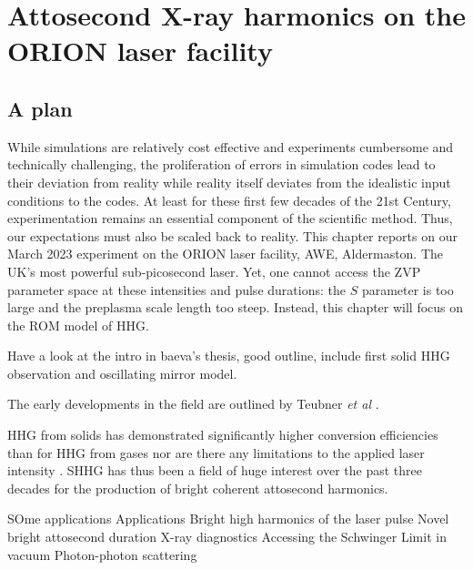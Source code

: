 \chapter{\label{ch:3-orion}Attosecond X-ray harmonics on the ORION laser facility} 

\minitoc

\section{A plan}

While simulations are relatively cost effective and experiments cumbersome and technically challenging, the proliferation of errors in simulation codes lead to their deviation from reality while reality itself deviates from the idealistic input conditions to the codes. At least for these first few decades of the 21st Century, experimentation remains an essential component of the scientific method. Thus, our expectations must also be scaled back to reality. This chapter reports on our March 2023 experiment on the ORION laser facility, AWE, Aldermaston. The UK's most powerful sub-picosecond laser. Yet, one cannot access the ZVP parameter space at these intensities and pulse durations: the $S$ parameter is too large and the preplasma scale length too steep. Instead, this chapter will focus on the ROM model of HHG. 


Have a look at the intro in baeva's thesis, good outline, include first solid HHG observation and oscillating mirror model.

The early developments in the field are outlined by Teubner \textit{et al} \cite{teubnerHighorderHarmonicsLaserirradiated2009}.


HHG from solids has demonstrated significantly higher conversion efficiencies than for HHG from gases nor are there any limitations to the applied laser intensity \cite{teubnerHighorderHarmonicsLaserirradiated2009}. SHHG has thus been a field of huge interest over the past three decades for the production of bright coherent attosecond harmonics.



SOme applications
Applications
Bright high harmonics of the laser pulse
Novel bright attosecond duration X-ray diagnostics
Accessing the Schwinger Limit in vacuum
Photon-photon scattering


